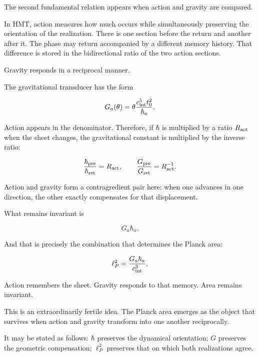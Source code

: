 The second fundamental relation appears when action and gravity are compared.\par

In HMT, action measures how much occurs while simultaneously preserving the orientation of the realization. There is one section before the return and another after it. The phase may return accompanied by a different memory history. That difference is stored in the bidirectional ratio of the two action sections.\par

Gravity responds in a reciprocal manner.\par

The gravitational transducer has the form\par

\[
G_a(\theta)
=
\theta\frac{c_{\rm int}^{5}t_0^2}{\hbar_a}.
\]

Action appears in the denominator. Therefore, if \(\hbar\) is multiplied by a ratio \(R_{\rm act}\) when the sheet changes, the gravitational constant is multiplied by the inverse ratio:\par

\[
\frac{\hbar_{\rm pre}}{\hbar_{\rm ret}}
=
R_{\rm act},
\qquad
\frac{G_{\rm pre}}{G_{\rm ret}}
=
R_{\rm act}^{-1}.
\]

Action and gravity form a contragredient pair here: when one advances in one direction, the other exactly compensates for that displacement.\par

What remains invariant is\par

\[
G_a\hbar_a.
\]

And that is precisely the combination that determines the Planck area:\par

\[
\ell_P^2=\frac{G_a\hbar_a}{c_{\rm int}^3}.
\]

Action remembers the sheet. Gravity responds to that memory. Area remains
invariant.\par

This is an extraordinarily fertile idea. The Planck area emerges as the object that survives when action and gravity transform into one another reciprocally.\par

It may be stated as follows: \(\hbar\) preserves the dynamical orientation; \(G\) preserves the geometric compensation; \(\ell_P^2\) preserves that on which both realizations agree.\par

